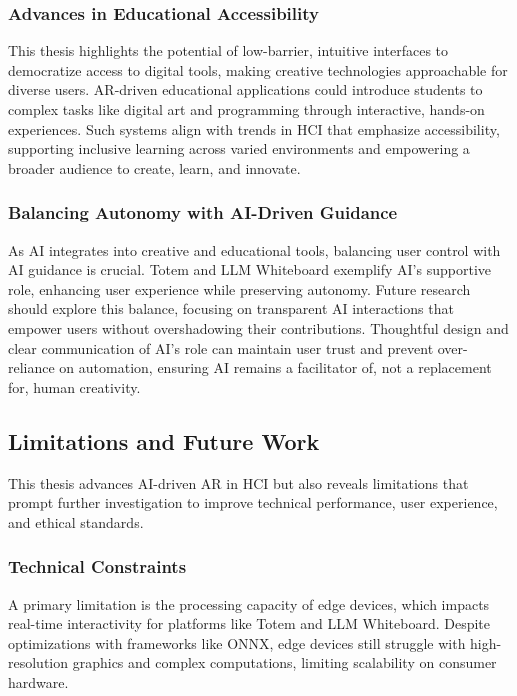 \subsubsection{Advances in Educational Accessibility}
This thesis highlights the potential of low-barrier, intuitive interfaces to democratize access to digital tools, making creative technologies approachable for diverse users.
AR-driven educational applications could introduce students to complex tasks like digital art and programming through interactive, hands-on experiences.
Such systems align with trends in HCI that emphasize accessibility, supporting inclusive learning across varied environments and empowering a broader audience to create, learn, and innovate.

\subsubsection{Balancing Autonomy with AI-Driven Guidance}
As AI integrates into creative and educational tools, balancing user control with AI guidance is crucial.
Totem and LLM Whiteboard exemplify AI’s supportive role, enhancing user experience while preserving autonomy.
Future research should explore this balance, focusing on transparent AI interactions that empower users without overshadowing their contributions.
Thoughtful design and clear communication of AI’s role can maintain user trust and prevent over-reliance on automation, ensuring AI remains a facilitator of, not a replacement for, human creativity.

\subsection{Limitations and Future Work}

This thesis advances AI-driven AR in HCI but also reveals limitations that prompt further investigation to improve technical performance, user experience, and ethical standards.

\subsubsection{Technical Constraints}
A primary limitation is the processing capacity of edge devices, which impacts real-time interactivity for platforms like Totem and LLM Whiteboard.
Despite optimizations with frameworks like ONNX, edge devices still struggle with high-resolution graphics and complex computations, limiting scalability on consumer hardware.

